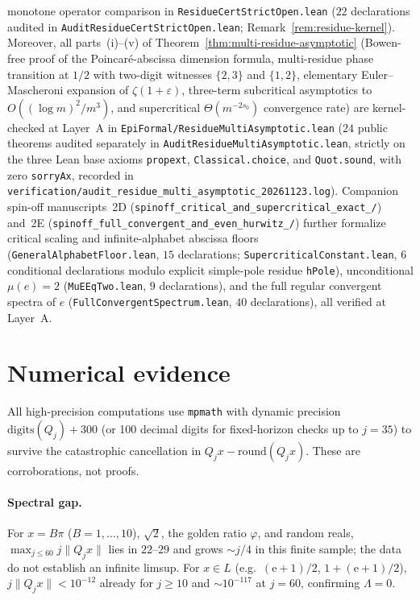 \documentclass[11pt]{article}
\theoremstyle{definition}
\theoremstyle{remark}
\newcommand{\ee}{\mathrm{e}}
\newcommand{\Lam}{\Lambda}
\begin{document}
monotone operator comparison in \texttt{Residue\allowbreak Cert\allowbreak StrictOpen.lean} ($22$ declarations audited in \texttt{AuditResidueCertStrictOpen.lean}; Remark~\ref{rem:residue-kernel}). Moreover, all parts~(i)--(v) of Theorem~\ref{thm:multi-residue-asymptotic} (Bowen-free proof of the Poincar\'e-abscissa dimension formula, multi-residue phase transition at $1/2$ with two-digit witnesses $\{2,3\}$ and $\{1,2\}$, elementary Euler--Mascheroni expansion of $\zeta(1+\varepsilon)$, three-term subcritical asymptotics to $O((\log m)^2/m^3)$, and supercritical $\Theta(m^{-2s_0})$ convergence rate) are kernel-checked at Layer~A in \texttt{EpiFormal/\allowbreak ResidueMultiAsymptotic.lean} ($24$ public theorems audited separately in \texttt{AuditResidueMultiAsymptotic.lean}, strictly on the three Lean base axioms \texttt{propext}, \texttt{Classical.choice}, and \texttt{Quot.sound}, with zero \texttt{sorryAx}, recorded in \texttt{verification/\allowbreak audit\_\allowbreak residue\_\allowbreak multi\_\allowbreak asymptotic\_\allowbreak 20261123.log}). Companion spin-off manuscripts~2D (\texttt{spinoff\_\allowbreak critical\_\allowbreak and\_\allowbreak supercritical\_\allowbreak exact\_/}) and~2E (\texttt{spinoff\_\allowbreak full\_\allowbreak convergent\_\allowbreak and\_\allowbreak even\_\allowbreak hurwitz\_/}) further formalize critical scaling and infinite-alphabet abscissa floors (\texttt{GeneralAlphabetFloor.lean}, $15$ declarations; \texttt{SupercriticalConstant.lean}, $6$ conditional declarations modulo explicit simple-pole residue \texttt{hPole}), unconditional $\mu(e)=2$ (\texttt{MuEEqTwo.lean}, $9$ declarations), and the full regular convergent spectra of $e$ (\texttt{FullConvergentSpectrum.lean}, $40$ declarations), all verified at Layer~A.

\section{Numerical evidence}\label{sec:num}

All high-precision computations use \texttt{mpmath} with dynamic precision
$\mathrm{digits}(Q_j)+300$ (or 100 decimal digits for fixed-horizon checks up
to $j=35$) to survive the catastrophic cancellation in
$Q_jx-\mathrm{round}(Q_jx)$. These are corroborations, not proofs.

\paragraph{Spectral gap.} For $x=B\pi$ ($B=1,\dots,10$), $\sqrt2$, the golden
ratio $\varphi$, and random reals, $\max_{j\le60}j\|Q_jx\|$ lies in $22$--$29$
and grows $\sim j/4$ in this finite sample; the data do not establish an
infinite limsup. For $x\in L$ (e.g.\ $(\ee+1)/2$, $1+(\ee+1)/2$),
$j\|Q_jx\|<10^{-12}$ already for $j\ge10$ and $\sim10^{-117}$ at $j=60$,
confirming $\Lam=0$.
\end{document}
